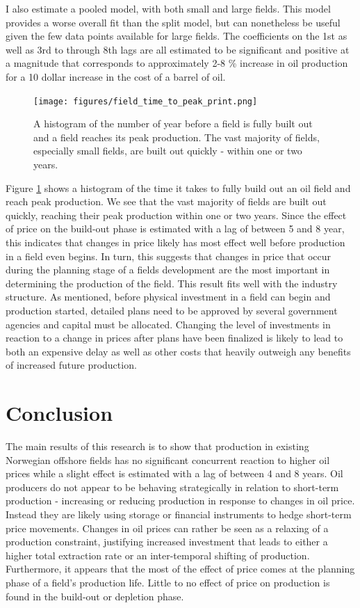 \documentclass[11pt]{article}
\begin{document}
I also estimate a pooled model, with both small and large fields.  This model provides a worse overall fit than the split model, but can nonetheless be useful given the few data points available for large fields.  The coefficients on the 1st as well as 3rd to through 8th lags are all estimated to be significant and positive at a magnitude that corresponds to approximately 2-8 \% increase in oil production for a 10 dollar increase in the cost of a barrel of oil.

\begin{figure}
	\texttt{[image: figures/field\_time\_to\_peak\_print.png]}
	\caption{A histogram of the number of year before a field is fully built out and a field reaches its peak production.  The vast majority of fields, especially small fields, are built out quickly - within one or two years.}
	\label{gam_buildout_hist}
\end{figure}

Figure \ref{gam_buildout_hist} shows a histogram of the time it takes to fully build out an oil field and reach peak production.  We see that the vast majority of fields are built out quickly, reaching their peak production within one or two years.  Since the effect of price on the build-out phase is estimated with a lag of between 5 and 8 year, this indicates that changes in price likely has most effect well before production in a field even begins.  In turn, this suggests that changes in price that occur during the planning stage of a fields development are the most important in determining the production of the field.  This result fits well with the industry structure.  As mentioned, before physical investment in a field can begin and production started, detailed plans need to be approved by several government agencies and capital must be allocated.  Changing the level of investments in reaction to a change in prices after plans have been finalized is likely to lead to both an expensive delay as well as other costs that heavily outweigh any benefits of increased future production.  




\section{Conclusion}

The main results of this research is to show that production in existing Norwegian offshore fields has no significant concurrent reaction to higher oil prices while a slight effect is estimated  with a lag of between 4 and 8 years.  Oil producers do not appear to be behaving strategically in relation to short-term production - increasing or reducing production in response to changes in oil price.  Instead they are likely using storage or financial instruments to hedge short-term price movements. Changes in oil prices can rather be seen as a relaxing of a production constraint, justifying increased investment that leads to either a higher total extraction rate or an inter-temporal shifting of production. Furthermore, it appears that the most of the effect of price comes at the planning phase of a field's production life.  Little to no effect of price on production is found in the build-out or depletion phase.
\end{document}
